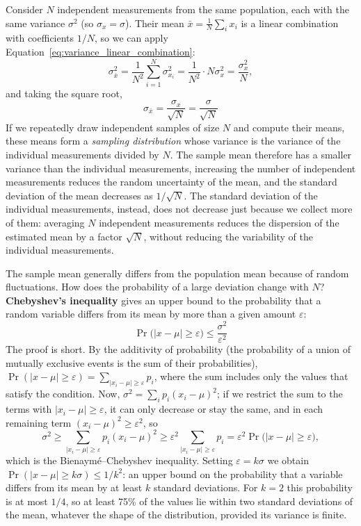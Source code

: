 \documentclass[letterpaper,11pt,leqno]{book}
\begin{document}
Consider $N$ independent measurements from the same population, each with the same variance $\sigma^2$ (so $\sigma_x = \sigma$). Their mean $\bar{x} = \frac{1}{N}\sum_i x_i$ is a linear combination with coefficients $1/N$, so we can apply Equation~\eqref{eq:variance_linear_combination}:
\begin{equation*}
\sigma_{\bar{x}}^2 = \frac{1}{N^2}\sum_{i=1}^{N}\sigma_{x_i}^2 = \frac{1}{N^2}\cdot N\sigma_x^2 = \frac{\sigma_x^2}{N},
\end{equation*}
and taking the square root,
\begin{equation}
\boxed{\sigma_{\bar{x}} = \frac{\sigma_x}{\sqrt{N}} = \frac{\sigma}{\sqrt{N}}}
\label{eq:sigma_mean}
\end{equation}
If we repeatedly draw independent samples of size $N$ and compute their means, these means form a \emph{sampling distribution} whose variance is the variance of the individual measurements divided by $N$. The sample mean therefore has a smaller variance than the individual measurements, increasing the number of independent measurements reduces the random uncertainty of the mean, and the standard deviation of the mean decreases as $1/\sqrt{N}$. The standard deviation of the individual measurements, instead, does not decrease just because we collect more of them: averaging $N$ independent measurements reduces the dispersion of the estimated mean by a factor $\sqrt{N}$, without reducing the variability of the individual measurements.

The sample mean generally differs from the population mean because of random fluctuations. How does the probability of a large deviation change with $N$? \textbf{Chebyshev's inequality} gives an upper bound to the probability that a random variable differs from its mean by more than a given amount $\varepsilon$:
\begin{equation}
\boxed{\Pr\big(|x - \mu| \ge \varepsilon\big) \le \frac{\sigma^2}{\varepsilon^2}}
\label{eq:chebyshev}
\end{equation}
The proof is short. By the additivity of probability (the probability of a union of mutually exclusive events is the sum of their probabilities), $\Pr(|x - \mu| \ge \varepsilon) = \sum_{|x_i - \mu| \ge \varepsilon}p_i$, where the sum includes only the values that satisfy the condition. Now, $\sigma^2 = \sum_i p_i(x_i - \mu)^2$; if we restrict the sum to the terms with $|x_i - \mu| \ge \varepsilon$, it can only decrease or stay the same, and in each remaining term $(x_i - \mu)^2 \ge \varepsilon^2$, so
\begin{equation*}
\sigma^2 \ge \sum_{|x_i - \mu| \ge \varepsilon}p_i(x_i - \mu)^2 \ge \varepsilon^2\sum_{|x_i - \mu| \ge \varepsilon}p_i = \varepsilon^2\Pr\big(|x - \mu| \ge \varepsilon\big),
\end{equation*}
which is the Bienaym\'e--Chebyshev inequality. Setting $\varepsilon = k\sigma$ we obtain $\Pr(|x - \mu| \ge k\sigma) \le 1/k^2$: an upper bound on the probability that a variable differs from its mean by at least $k$ standard deviations. For $k = 2$ this probability is at most $1/4$, so at least 75\% of the values lie within two standard deviations of the mean, whatever the shape of the distribution, provided its variance is finite.
\end{document}
